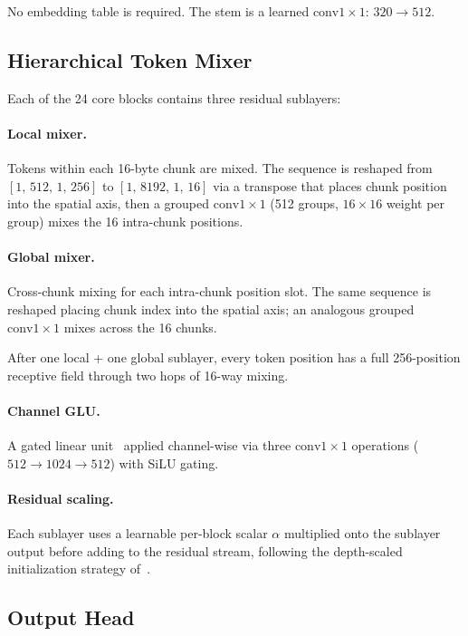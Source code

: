 \documentclass[10pt,twocolumn]{article}
\begin{document}
No embedding table is required.
The stem is a learned $\text{conv}1{\times}1$: $320 \to 512$.

\subsection{Hierarchical Token Mixer}

Each of the 24 core blocks contains three residual sublayers:

\paragraph{Local mixer.}
Tokens within each 16-byte chunk are mixed.
The sequence is reshaped from
$[1,\,512,\,1,\,256]$
to $[1,\,8192,\,1,\,16]$ via a transpose that places chunk position into the
spatial axis, then a grouped $\text{conv}1{\times}1$ (512 groups, $16{\times}16$
weight per group) mixes the 16 intra-chunk positions.

\paragraph{Global mixer.}
Cross-chunk mixing for each intra-chunk position slot.
The same sequence is reshaped placing chunk index into the spatial axis;
an analogous grouped $\text{conv}1{\times}1$ mixes across the 16 chunks.

After one local + one global sublayer, every token position has a full
256-position receptive field through two hops of 16-way mixing.

\paragraph{Channel GLU.}
A gated linear unit~\cite{TODO_dauphin_glu} applied channel-wise via
three $\text{conv}1{\times}1$ operations ($512{\to}1024{\to}512$) with
SiLU gating.

\paragraph{Residual scaling.}
Each sublayer uses a learnable per-block scalar $\alpha$ multiplied onto
the sublayer output before adding to the residual stream, following the
depth-scaled initialization strategy of~\cite{TODO_brock2021}.

\subsection{Output Head}
\end{document}
